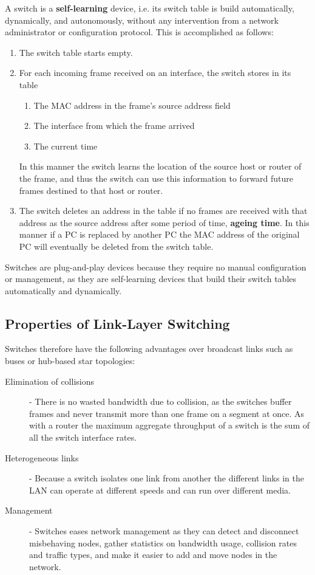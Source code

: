 \documentclass[12pt letter]{report}
\begin{document}
A switch is a \textbf{self-learning} device, i.e. its switch table is
build automatically, dynamically, and autonomously, without any
intervention from a network administrator or configuration protocol.
This is accomplished as follows:
\begin{enumerate}
  \item The switch table starts empty.
  \item  For each incoming frame received on an interface, the switch
    stores in its table
    \begin{enumerate}
      \item The MAC address in the frame's source address field
      \item The interface from which the frame arrived
      \item The current time
    \end{enumerate}
    In this manner the switch learns the location of the source host
    or router of the frame, and thus the switch can use this
    information to forward future frames destined to that host or router.
  \item The switch deletes an address in the table if no frames are
    received with that address as the source address after some
    period of time, \textbf{ageing time}. In this manner if a PC is
    replaced by another PC the MAC address of the original PC will
    eventually be deleted from the switch table.
\end{enumerate}

Switches are plug-and-play devices because they require no manual
configuration or management, as they are self-learning devices that
build their switch tables automatically and dynamically.

\subsection{Properties of Link-Layer Switching}

Switches therefore have the following advantages over broadcast links
such as buses or hub-based star topologies:
\begin{description}
  \item[Elimination of collisions]  - There is no wasted bandwidth
    due to collision, as the switches buffer frames and never
    transmit more than one frame on a segment at once. As with a
    router the maximum aggregate throughput of a switch is the sum of
    all the switch interface rates.
  \item[Heterogeneous links] - Because a switch isolates one link
    from another the different  links in the LAN can operate at
    different speeds and can run over different media.
  \item[Management] - Switches eases network management as they can
    detect and disconnect misbehaving nodes, gather statistics on
    bandwidth usage, collision rates and traffic types, and make it
    easier to add and move nodes in the network.
\end{description}
\end{document}
